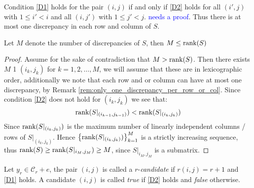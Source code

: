 \begin{remark}\label{rem:only_one_discrepancy_in_each_column_or_row}
  Condition \ref{D1} holds for the pair $(i, j)$ if and only if \ref{D2} holds for all $(i', j)$ with $1 \leq i' < i$ and all $(i, j')$ with $1 \leq j' < j$. \textcolor{blue}{needs a proof}.
  Thus there is at most one discrepancy in each row and column of $S$.
\end{remark}
\begin{lemma}\label{lem:rank_is_geq_number_of_discrepancies}
  Let $M$ denote the number of discrepancies of $S$, then $M \leq \textnormal{rank}(S)$
\end{lemma}
\begin{proof}
  Assume for the sake of contradiction that $M > \textnormal{rank}(S)$. Then there exists $M$ 1 $(i_k, j_k)$ for $k = 1, 2, \ldots, M$, we will assume that these are in lexicographic order, additionally we note that each row and or column can have at most one discrepancy, by Remark \ref{rem:only_one_discrepancy_per_row_or_col}. Since condition \ref{D2} does not hold for $(i_k, j_k)$ we see that:
  \begin{equation*}
    \textnormal{rank}(S \vert_{(i_{k - 1}, j_{k - 1})}) < \textnormal{rank}(S |_{(i_k, j_k)})
  \end{equation*}
  Since $\textnormal{rank}(S |_{(i_k, j_k)})$ is the maximum number of linearly independent columns / rows of $S |_{(i_k, j_k)}$. Hence $\left\{\textnormal{rank}(S \vert_{(i_k, j_k)})\right\}_{k = 1}^M$ is a strictly increasing sequence, thus $\textnormal{rank}(S) \geq \textnormal{rank}(S |_{i_M, j_M}) \geq M$, since $S |_{i_M, j_M}$ is a submatrix.
\end{proof}

\begin{definition}
  Let $y_r \in \mathcal{C}_r + e$, the pair $(i, j)$ is called a $r$-\textit{candidate} if $r(i, j) = r + 1$ and \ref{D1} holds. A candidate $(i, j)$ is called \textit{true} if \ref{D2} holds and \textit{false} otherwise.
\end{definition}

